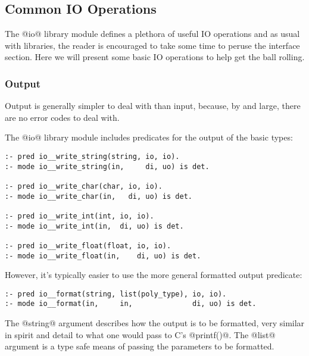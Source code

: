 \documentclass[a4paper,11pt,notitlepage,onecolumn]{article}
\begin{document}
\subsection{Common IO Operations}

The @io@ library module defines a plethora of useful IO
operations and as usual with libraries, the reader is
encouraged to take some time to peruse the interface section.
Here we will present some basic IO operations to help get the
ball rolling.

\subsubsection{Output}

Output is generally simpler to deal with than input,
because, by and large, there are no error codes to deal
with.

The @io@ library module includes predicates for the output
of the basic types:
\begin{verbatim}
:- pred io__write_string(string, io, io).
:- mode io__write_string(in,     di, uo) is det.

:- pred io__write_char(char, io, io).
:- mode io__write_char(in,   di, uo) is det.

:- pred io__write_int(int, io, io).
:- mode io__write_int(in,  di, uo) is det.

:- pred io__write_float(float, io, io).
:- mode io__write_float(in,    di, uo) is det.
\end{verbatim}
However, it's typically easier to use the more general
formatted output predicate:
\begin{verbatim}
:- pred io__format(string, list(poly_type), io, io).
:- mode io__format(in,     in,              di, uo) is det.
\end{verbatim}
The @string@ argument describes how the output is to be formatted, very
similar in spirit and detail to what one would pass to C's @printf()@.
The @list@ argument is a type safe means of passing the parameters to be
formatted.
\end{document}
